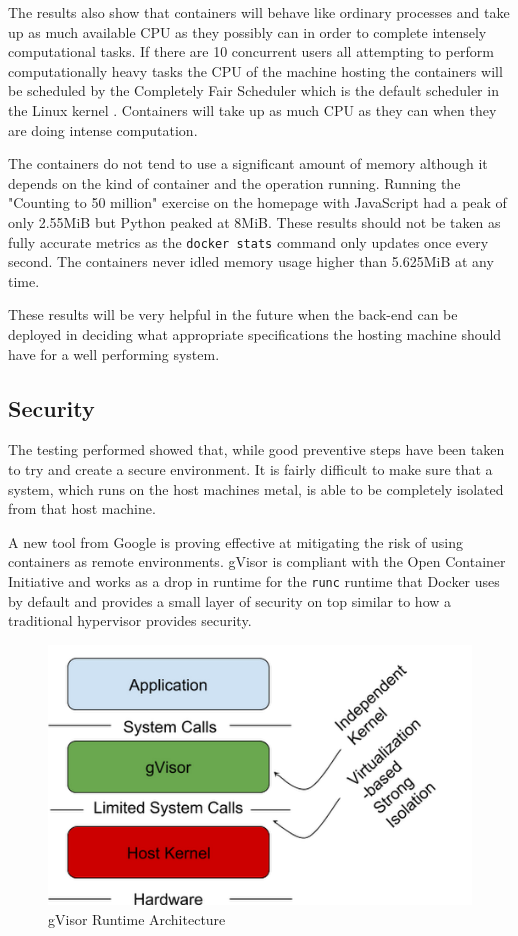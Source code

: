 \documentclass[12pt, a4paper]{extreport}
\begin{document}
The results also show that containers will behave like ordinary processes and take up as much available CPU as they possibly can in order to complete intensely computational tasks. If there are 10 concurrent users all attempting to perform computationally heavy tasks the CPU of the machine hosting the containers will be scheduled by the Completely Fair Scheduler which is the default scheduler in the Linux kernel \cite{cfs-article}.
Containers will take up as much CPU as they can when they are doing intense computation.

The containers do not tend to use a significant amount of memory although it depends on the kind of container and the operation running. Running the "Counting to 50 million" exercise on the homepage with JavaScript had a peak of only 2.55MiB but Python peaked at 8MiB. These results should not be taken as fully accurate metrics as the \texttt{docker stats} command only updates once every second. The containers never idled memory usage higher than 5.625MiB at any time.

These results will be very helpful in the future when the back-end can be deployed in deciding what appropriate specifications the hosting machine should have for a well performing system.

\subsection{Security}

The testing performed showed that, while good preventive steps have been taken to try and create a secure environment. It is fairly difficult to make sure that a system, which runs on the host machines metal, is able to be completely isolated from that host machine.

A new tool from Google is proving effective at mitigating the risk of using containers as remote environments. gVisor \cite{gvisor} is compliant with the Open Container Initiative and works as a drop in runtime for the \texttt{runc} runtime that Docker uses by default and provides a small layer of security on top similar to how a traditional hypervisor provides security.

\begin{figure}[h!]
    \centering
    \includegraphics[scale=0.5]{res/gvisor.PNG}
    \caption{gVisor Runtime Architecture \cite{gvisor-info}}
    \label{fig:gvisor}
\end{figure}
\end{document}
